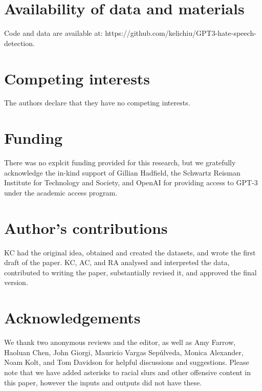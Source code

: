 \documentclass{bmcart}
\begin{document}

\begin{backmatter}

\section*{Availability of data and materials}
Code and data are available at: https://github.com/kelichiu/GPT3-hate-speech-detection. 

\section*{Competing interests}
  The authors declare that they have no competing interests.
  
\section*{Funding}
There was no explcit funding provided for this research, but we gratefully acknowledge the in-kind support of Gillian Hadfield, the Schwartz Reisman Institute for Technology and Society, and OpenAI for providing access to GPT-3 under the academic access program. 

\section*{Author's contributions}
  KC had the original idea, obtained and created the datasets, and wrote the first draft of the paper. KC, AC, and RA analysed and interpreted the data, contributed to writing the paper, substantially revised it, and approved the final version.

\section*{Acknowledgements}
  We thank two anonymous reviews and the editor, as well as Amy Farrow, Haoluan Chen, John Giorgi, Mauricio Vargas Sepúlveda, Monica Alexander, Noam Kolt, and Tom Davidson for helpful discussions and suggestions. Please note that we have added asterisks to racial slurs and other offensive content in this paper, however the inputs and outputs did not have these.
  

\end{backmatter}
\end{document}
